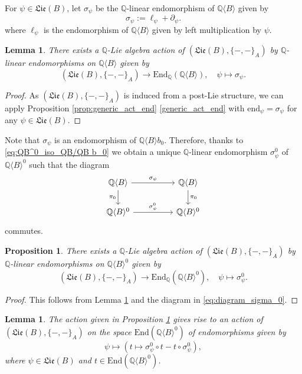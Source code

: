 \documentclass[11pt, a4paper]{amsart}
\newtheorem{proposition}[theorem]{Proposition}
\newtheorem{lemma}[theorem]{Lemma}
\numberwithin{equation}{section}
\theoremstyle{definition}
\newcommand{\Q}{\mathbb{Q}}
\newcommand{\QB}{\Q\langle B\rangle}
\newcommand{\Lie}{\mathfrak{Lie}}
\begin{document}
For $\psi \in \Lie(B)$, let $\sigma_\psi$ be the $\Q$-linear endomorphism of $\QB$ given by
\begin{equation} \label{eq:def_sigma}
    \sigma_\psi := \ell_\psi + \partial_{\psi}.
\end{equation}
where $\ell_\psi$ is the endomorphism of $\QB$ given by left multiplication by $\psi$.

\begin{lemma} \label{lem:Lib_act_QB}
There exists a $\Q$-Lie algebra action of $(\Lie(B), \{-,-\}_A)$ by $\Q$-linear endomorphisms on $\QB$ given by
\[
(\Lie(B), \{-,-\}_A) \to \mathrm{End}_{\Q}(\QB), \quad \psi \mapsto \sigma_{\psi}.
\]
\end{lemma}
\begin{proof}
As $(\Lie(B),\{-,-\}_A)$ is induced from a post-Lie structure, we can apply Proposition \ref{prop:generic_act_end} \ref{generic_act_end} with $\mathrm{end}_\psi = \sigma_\psi$ for any $\psi \in \Lie(B)$. 
\end{proof}

Note that $\sigma_\psi$ is an endomorphism of $\QB b_0$. Therefore, thanks to \eqref{eq:QB^0_iso_QB/QB b_0} we obtain a unique $\Q$-linear endomorphism $\sigma^0_\psi$ of $\QB^0$ such that the diagram
\begin{equation} \label{eq:diagram_sigma_0}
\begin{tikzcd}
    \QB \ar[rr, "\sigma_\psi"] \ar[d, "\pi_0"'] && \QB \ar[d, "\pi_0"] \\
    \QB^0 \ar[rr, "\sigma^0_\psi"] && \QB^0
\end{tikzcd}
\end{equation}
commutes.
\begin{proposition} \label{prop:Lib_act_QB0}
    There exists a $\Q$-Lie algebra action of $(\Lie(B), \{-,-\}_A)$ by $\Q$-linear endomorphisms on $\QB^0$ given by
    \[
        (\Lie(B), \{-,-\}_A) \to \mathrm{End}_{\Q}(\QB^0), \quad \psi \mapsto \sigma_\psi^0.
    \]
\end{proposition}

\begin{proof} This follows from Lemma \ref{lem:Lib_act_QB} and the diagram in \eqref{eq:diagram_sigma_0}.
\end{proof}

\begin{lemma} The action given in Proposition \ref{prop:Lib_act_QB0} gives rise to an action of $(\Lie(B), \{-,-\}_A)$ on the space $\mathrm{End}(\QB^0)$ of endomorphisms given by 
\begin{equation}
    \label{LA_act_on_tau}
    \psi \longmapsto \left( t \mapsto \sigma^0_\psi \circ t - t \circ \sigma^0_\psi \right),
\end{equation}
where $\psi \in \Lie(B)$ and $t \in \mathrm{End}(\QB^0)$. 
\end{lemma}
\end{document}

